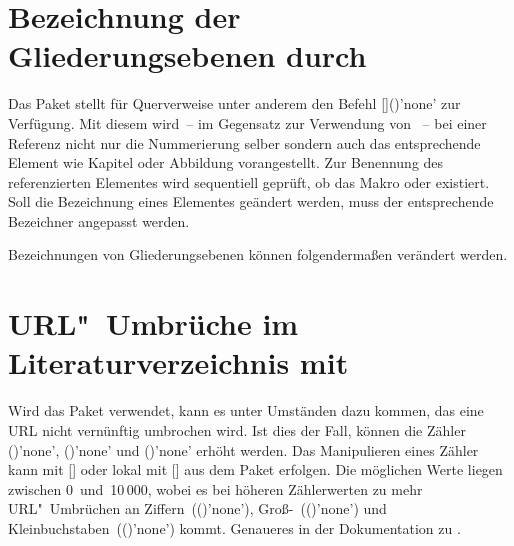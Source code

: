 \section{%
  Bezeichnung der Gliederungsebenen durch %
  \label{sec:tips:references}%
}

%
Das Paket  stellt für Querverweise unter anderem den Befehl 
[]()'none' zur Verfügung. Mit 
diesem wird~-- im Gegensatz zur Verwendung von ~-- bei einer 
Referenz nicht nur die Nummerierung selber sondern auch das entsprechende 
Element wie Kapitel oder Abbildung vorangestellt. Zur Benennung des 
referenzierten Elementes wird sequentiell geprüft, ob das Makro 
 oder 
 existiert. Soll die Bezeichnung eines 
Elementes geändert werden, muss der entsprechende Bezeichner angepasst werden.
%
\begin{Example}
Bezeichnungen von Gliederungsebenen können folgendermaßen verändert werden.
\begin{Code}
\end{Code}
\end{Example}



\section{%
  URL"~Umbrüche im Literaturverzeichnis mit %
}

%
Wird das Paket  verwendet, kann es unter Umständen dazu 
kommen, das eine URL nicht vernünftig umbrochen wird. Ist dies der Fall, 
können die Zähler ()'none', 
()'none' und 
()'none' erhöht werden. Das 
Manipulieren eines Zähler kann mit [] oder 
lokal mit [] aus dem Paket 
 erfolgen. Die möglichen Werte liegen zwischen 0~und~10\,000, 
wobei es bei höheren Zählerwerten zu mehr URL"~Umbrüchen an 
Ziffern~(()'none'), 
Groß-~(()'none') und 
Kleinbuchstaben~(()'none') kommt. 
Genaueres in der Dokumentation zu .



